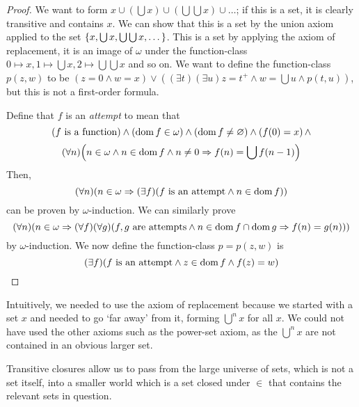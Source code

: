 \begin{proof}
    We want to form \( x \cup (\bigcup x) \cup (\bigcup\bigcup x) \cup \dots \); if this is a set, it is clearly transitive and contains \( x \).
    We can show that this is a set by the union axiom applied to the set \( \qty{x, \bigcup x, \bigcup\bigcup x, \dots} \).
    This is a set by applying the axiom of replacement, it is an image of \( \omega \) under the function-class \( 0 \mapsto x, 1 \mapsto \bigcup x, 2 \mapsto \bigcup \bigcup x \) and so on.
    We want to define the function-class \( p(z,w) \) to be \( (z = 0 \wedge w = x) \vee ((\exists t)(\exists u) z = t^+ \wedge w = \bigcup u \wedge p(t,u)) \), but this is not a first-order formula.

    Define that \( f \) is an \emph{attempt} to mean that
    \[ (f \text{ is a function}) \wedge (\operatorname{dom} f \in \omega) \wedge (\operatorname{dom} f \neq \varnothing) \wedge (f(0) = x)\, \wedge \]
    \[ (\forall n)\qty(n \in \omega \wedge n \in \operatorname{dom} f \wedge n \neq 0 \Rightarrow f(n) = \bigcup f(n-1)) \]
    Then,
    \[ (\forall n)(n \in \omega \Rightarrow (\exists f)(f \text{ is an attempt} \wedge n \in \operatorname{dom} f)) \]
    can be proven by \( \omega \)-induction.
    We can similarly prove
    \[ (\forall n)(n \in \omega \Rightarrow (\forall f)(\forall g)(f, g \text{ are attempts} \wedge n \in \operatorname{dom} f \cap \operatorname{dom} g \Rightarrow f(n) = g(n))) \]
    by \( \omega \)-induction.
    We now define the function-class \( p = p(z,w) \) is
    \[ (\exists f)(f \text{ is an attempt} \wedge z \in \operatorname{dom} f \wedge f(z) = w) \]
\end{proof}
Intuitively, we needed to use the axiom of replacement because we started with a set \( x \) and needed to go `far away' from it, forming \( \bigcup^n x \) for all \( x \).
We could not have used the other axioms such as the power-set axiom, as the \( \bigcup^n x \) are not contained in an obvious larger set.

Transitive closures allow us to pass from the large universe of sets, which is not a set itself, into a smaller world which is a set closed under \( \in \) that contains the relevant sets in question.

